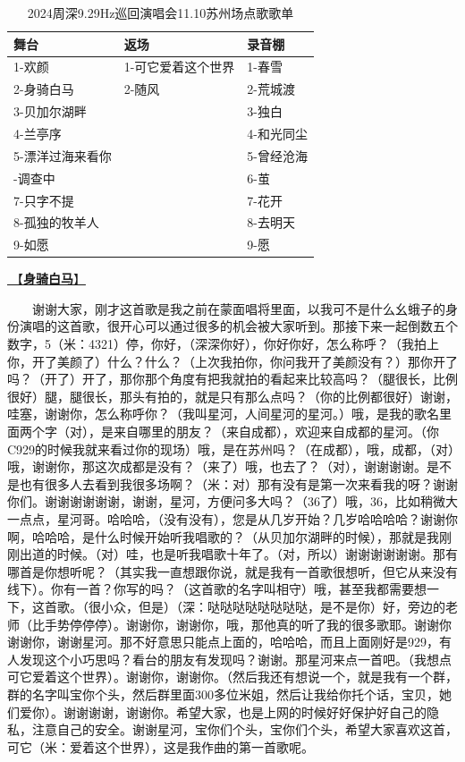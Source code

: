 \documentclass[]{ctexbook}
\begin{document}
\begin{table}

\caption{\label{tab:unnamed-chunk-122}2024周深9.29Hz巡回演唱会11.10苏州场点歌歌单}
\centering
\begin{tabular}[t]{lll}
\toprule
舞台 & 返场 & 录音棚\\
\midrule
1-欢颜 & 1-可它爱着这个世界 & 1-春雪\\
2-身骑白马 & 2-随风 & 2-荒城渡\\
3-贝加尔湖畔 &  & 3-独白\\
4-兰亭序 &  & 4-和光同尘\\
5-漂洋过海来看你 &  & 5-曾经沧海\\
\addlinespace
6-调查中 &  & 6-茧\\
7-只字不提 &  & 7-花开\\
8-孤独的牧羊人 &  & 8-去明天\\
9-如愿 &  & 9-愿\\
\bottomrule
\end{tabular}
\end{table}

\hyperref[on-the-white-horse]{🎵【\textbf{身骑白马}】}

  谢谢大家，刚才这首歌是我之前在蒙面唱将里面，以我可不是什么幺蛾子的身份演唱的这首歌，很开心可以通过很多的机会被大家听到。那接下来一起倒数五个数字，5（米：4321）停，你好，（深深你好），你好你好，怎么称呼？（我拍上你，开了美颜了）什么？什么？（上次我拍你，你问我开了美颜没有？）那你开了吗？（开了）开了，那你那个角度有把我就拍的看起来比较高吗？（腿很长，比例很好）腿，腿很长，那头有拍的，就是只有那么点吗？（你的比例都很好）谢谢，哇塞，谢谢你，怎么称呼你？（我叫星河，人间星河的星河。）哦，是我的歌名里面两个字（对），是来自哪里的朋友？（来自成都），欢迎来自成都的星河。（你C929的时候我就来看过你的现场）哦，是在苏州吗？（在成都），哦，成都，（对）哦，谢谢你，那这次成都是没有？（来了）哦，也去了？（对），谢谢谢谢。是不是也有很多人去看到我很多场啊？（米：对）那有没有是第一次来看我的呀？谢谢你们。谢谢谢谢谢谢，谢谢，星河，方便问多大吗？（36了）哦，36，比如稍微大一点点，星河哥。哈哈哈，（没有没有），您是从几岁开始？几岁哈哈哈哈？谢谢你啊，哈哈哈，是什么时候开始听我唱歌的？（从贝加尔湖畔的时候），那就是我刚刚出道的时候。（对）哇，也是听我唱歌十年了。（对，所以）谢谢谢谢谢谢。那有哪首是你想听呢？（其实我一直想跟你说，就是我有一首歌很想听，但它从来没有线下）。你有一首？你写的吗？（这首歌的名字叫相守）哦，甚至我都需要想一下，这首歌。（很小众，但是）（深：哒哒哒哒哒哒哒哒，是不是你）好，旁边的老师（比手势停停停）。谢谢你，谢谢你，哦，那他真的听了我的很多歌耶。谢谢你谢谢你，谢谢星河。那不好意思只能点上面的，哈哈哈，而且上面刚好是929，有人发现这个小巧思吗？看台的朋友有发现吗？谢谢。那星河来点一首吧。（我想点可它爱着这个世界）。谢谢你，谢谢你。（然后我还有想说一个，就是我有一个群，群的名字叫宝你个头，然后群里面300多位米姐，然后让我给你托个话，宝贝，她们爱你）。谢谢谢谢，谢谢你。希望大家，也是上网的时候好好保护好自己的隐私，注意自己的安全。谢谢星河，宝你们个头，宝你们个头，希望大家喜欢这首，可它（米：爱着这个世界），这是我作曲的第一首歌呢。
\end{document}
